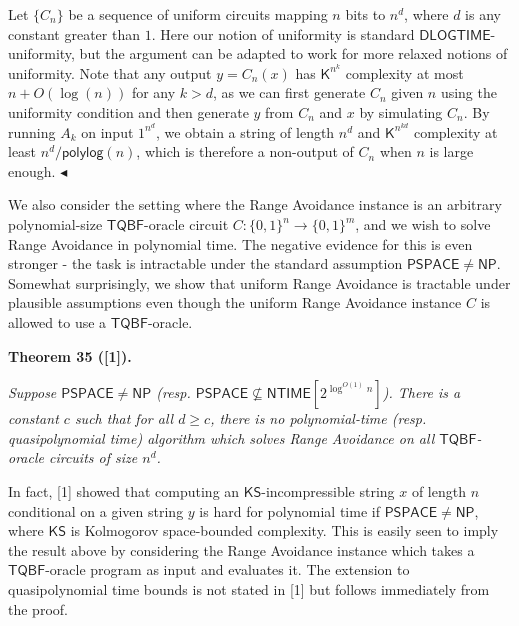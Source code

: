 \documentclass[10pt,a4paper]{article}
\begin{document}
Let $\{C_{n}\}$ be a sequence of uniform circuits mapping $n$ bits to $n^{d}$, where $d$ is any constant greater than $1$. Here our notion of uniformity is standard $\mathsf{DLOGTIME}$-uniformity, but the argument can be adapted to work for more relaxed notions of uniformity. Note that any output $y=C_{n}(x)$ has ${\mathsf{K}}^{n^{k}}$ complexity at most $n+O(\log(n))$ for any $k>d$, as we can first generate $C_{n}$ given $n$ using the uniformity condition and then generate $y$ from $C_{n}$ and $x$ by simulating $C_{n}$. By running $A_{k}$ on input $1^{n^{d}}$, we obtain a string of length $n^{d}$ and ${\mathsf{K}}^{n^{kd}}$ complexity at least $n^{d}/{\mathsf{polylog}}(n)$, which is therefore a non-output of $C_{n}$ when $n$ is large enough.
$\blacktriangleleft$\par




We also consider the setting where the Range Avoidance instance is an arbitrary polynomial-size $\mathsf{TQBF}$-oracle circuit $C:\{0,1\}^{n}\to\{0,1\}^{m}$, and we wish to solve Range Avoidance in polynomial time. The negative evidence for this is even stronger - the task is intractable under the standard assumption ${\mathsf{PSPACE}}\neq{\mathsf{NP}}$. Somewhat surprisingly, we show that uniform Range Avoidance is tractable under plausible assumptions even though the uniform Range Avoidance instance $C$ is allowed to use a $\mathsf{TQBF}$-oracle.\par





\par\medskip\noindent\textbf{
\textbf{Theorem 35}\textbf{ }([1])\textbf{.}
}\par



\emph{Suppose ${\mathsf{PSPACE}}\neq{\mathsf{NP}}$ (resp. ${\mathsf{PSPACE}}\not\subseteq{\mathsf{NTIME}}[2^{\log^{O(1)}n}]$).
There is a constant $c$ such that for all $d\geq c$, there is no polynomial-time (resp. quasipolynomial time) algorithm which solves Range Avoidance on all $\mathsf{TQBF}$-oracle circuits of size $n^{d}$.}\par






In fact, [1] showed that computing an $\mathsf{KS}$-incompressible string $x$ of length $n$ conditional on a given string $y$ is hard for polynomial time if $\mathsf{PSPACE}\neq{\mathsf{NP}}$, where $\mathsf{KS}$ is Kolmogorov space-bounded complexity. This is easily seen to imply the result above by considering the Range Avoidance instance which takes a $\mathsf{TQBF}$-oracle program as input and evaluates it. The extension to quasipolynomial time bounds is not stated in [1] but follows immediately from the proof.\par
\end{document}
